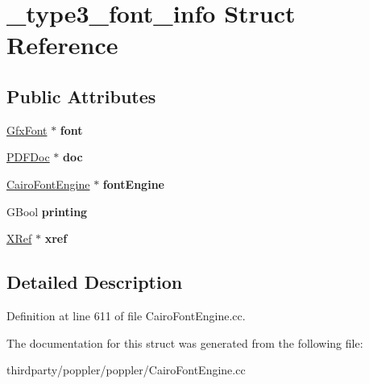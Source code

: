 \hypertarget{struct__type3__font__info}{}\section{\+\_\+type3\+\_\+font\+\_\+info Struct Reference}
\label{struct__type3__font__info}
\subsection*{Public Attributes}
\begin{DoxyCompactItemize}
\item 
\mbox{\label{struct__type3__font__info_ae54fd20107a92b02406aee3ddf30606e}} 
\hyperlink{class_gfx_font}{Gfx\+Font} $\ast$ {\bfseries font}
\item 
\mbox{\label{struct__type3__font__info_a54ac599b48faa2281966a2d6fb11e4db}} 
\hyperlink{class_p_d_f_doc}{P\+D\+F\+Doc} $\ast$ {\bfseries doc}
\item 
\mbox{\label{struct__type3__font__info_ab8ecd23c2eba01c1a1cea39609c7fe22}} 
\hyperlink{class_cairo_font_engine}{Cairo\+Font\+Engine} $\ast$ {\bfseries font\+Engine}
\item 
\mbox{\label{struct__type3__font__info_a1ad9cfaabb793584686525527dad9f24}} 
G\+Bool {\bfseries printing}
\item 
\mbox{\label{struct__type3__font__info_a49304d9d229bca6439dadc62e013d161}} 
\hyperlink{class_x_ref}{X\+Ref} $\ast$ {\bfseries xref}
\end{DoxyCompactItemize}


\subsection{Detailed Description}


Definition at line 611 of file Cairo\+Font\+Engine.\+cc.



The documentation for this struct was generated from the following file\+:\begin{DoxyCompactItemize}
\item 
thirdparty/poppler/poppler/Cairo\+Font\+Engine.\+cc\end{DoxyCompactItemize}
